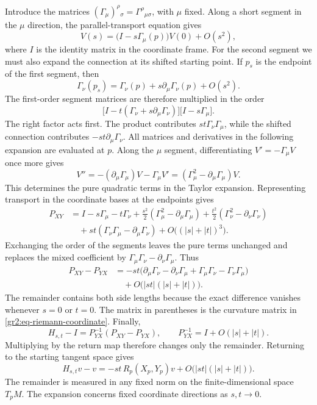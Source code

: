\documentclass[11pt,a4paper]{article}
\numberwithin{equation}{section}
\begin{document}
Introduce the matrices \((\Gamma_\mu)^\rho{}_{\sigma}
=\Gamma^\rho{}_{\mu\sigma}\), with \(\mu\) fixed. Along a short segment
in the \(\mu\) direction, the parallel-transport equation gives
\[
 V(s)=\bigl(I-s\Gamma_\mu(p)\bigr)V(0)+O(s^2),
\]
where \(I\) is the identity matrix in the coordinate frame. For the
second segment we must also expand the connection at its shifted
starting point. If \(p_s\) is the endpoint of the first segment, then
\[
 \Gamma_\nu(p_s)
 =\Gamma_\nu(p)+s\partial_\mu\Gamma_\nu(p)+O(s^2).
\]
The first-order segment matrices are therefore multiplied in the order
\[
 \bigl[I-t(\Gamma_\nu+s\partial_\mu\Gamma_\nu)\bigr]
 \bigl[I-s\Gamma_\mu\bigr].
\]
The right factor acts first. The product contributes
\(st\Gamma_\nu\Gamma_\mu\), while the shifted connection contributes
\(-st\partial_\mu\Gamma_\nu\). All matrices and derivatives in the
following expansion are evaluated at \(p\). Along the \(\mu\) segment,
differentiating \(V'=-\Gamma_\mu V\) once more gives
\[
 V''=-(\partial_\mu\Gamma_\mu)V-\Gamma_\mu V'
     =(\Gamma_\mu^2-\partial_\mu\Gamma_\mu)V.
\]
This determines the pure quadratic terms in the Taylor expansion.
Representing transport in the coordinate bases at the endpoints gives
\begin{align*}
 P_{XY}
 &=I-s\Gamma_\mu-t\Gamma_\nu
   +\frac{s^2}{2}(\Gamma_\mu^2-\partial_\mu\Gamma_\mu)
   +\frac{t^2}{2}(\Gamma_\nu^2-\partial_\nu\Gamma_\nu)\\
 &\quad+st(\Gamma_\nu\Gamma_\mu-\partial_\mu\Gamma_\nu)
   +O\bigl((|s|+|t|)^3\bigr).
\end{align*}
Exchanging the order of the segments leaves the pure terms unchanged
and replaces the mixed coefficient by
\(\Gamma_\mu\Gamma_\nu-\partial_\nu\Gamma_\mu\). Thus
\begin{align*}
 P_{XY}-P_{YX}
 &=-st\bigl(\partial_\mu\Gamma_\nu-\partial_\nu\Gamma_\mu
            +\Gamma_\mu\Gamma_\nu-\Gamma_\nu\Gamma_\mu\bigr)\\
 &\quad+O\bigl(|st|(|s|+|t|)\bigr).
\end{align*}
The remainder contains both side lengths because the exact difference
vanishes whenever \(s=0\) or \(t=0\). The matrix in parentheses is the
curvature matrix in \eqref{gr2:eq-riemann-coordinate}.
Finally,
\[
 H_{s,t}-I=P_{YX}^{-1}(P_{XY}-P_{YX}),\qquad
 P_{YX}^{-1}=I+O(|s|+|t|).
\]
Multiplying by the return map therefore changes only the remainder.
Returning to the starting tangent space gives
\begin{equation}
 H_{s,t}v-v
 =-st\,R_p(X_p,Y_p)v
  +O\bigl(|st|(|s|+|t|)\bigr).
 \label{gr2:eq-small-loop}
\end{equation}
The remainder is measured in any fixed norm on the finite-dimensional
space \(T_pM\). The expansion concerns fixed coordinate directions as
\(s,t\to0\).
\end{document}
